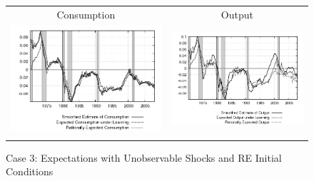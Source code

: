 \begin{figure}\label{fg:exp_reinit}\caption{Case 3: Expectations with Unobservable Shocks and RE Initial Conditions}\vspace*{1pc}
\hspace*{-0.7in}\begin{tabular}{cc}
Consumption & Output \\
\includegraphics[scale=0.52]{results_reinit/consumption_exp.png} & 
\includegraphics[scale=0.52]{results_reinit/output_exp.png} \\ \\ 
 

\end{tabular}
\end{figure}
